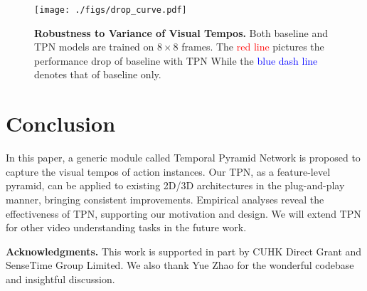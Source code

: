 \documentclass[10pt,twocolumn,letterpaper]{article}
\begin{document}
\begin{figure}[t]
    \centering
    \texttt{[image: ./figs/drop\_curve.pdf]}
    \caption{
        \textbf{Robustness to Variance of Visual Tempos.}
        Both baseline and TPN models are trained on $8 \times 8$ frames.
        The \textcolor{red}{red line} pictures the performance drop of baseline with TPN While the \textcolor{blue}{blue dash line} denotes that of baseline only.
    }
    \label{fig:drop_curve}
\end{figure}


 \section{Conclusion}
\label{sec:conclu}
In this paper, a generic module called Temporal Pyramid Network is proposed to capture the visual tempos of action instances.
Our TPN, as a feature-level pyramid, can be applied to existing 2D/3D architectures in the plug-and-play manner, bringing consistent improvements.
Empirical analyses reveal the effectiveness of TPN, supporting our motivation and design. We will extend TPN for other video understanding tasks in the future work.


\noindent \textbf{Acknowledgments.} 
This work is supported in part by CUHK Direct Grant and SenseTime Group Limited. 
We also thank Yue Zhao for the wonderful codebase and insightful discussion.
 

{\small


}
\end{document}
